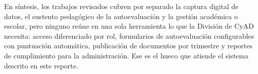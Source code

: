En síntesis, los trabajos revisados cubren por separado la captura digital de datos, el sustento pedagógico de la autoevaluación y la gestión académica o escolar, pero ninguno reúne en una sola herramienta lo que la División de CyAD necesita: acceso diferenciado por rol, formularios de autoevaluación configurables con puntuación automática, publicación de documentos por trimestre y reportes de cumplimiento para la administración. Ese es el hueco que atiende el sistema descrito en este reporte.


\newpage
